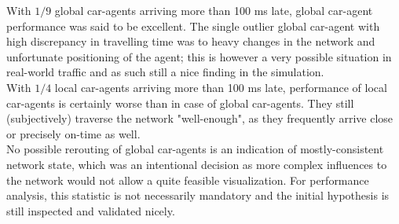 With $1/9$ global car-agents arriving more than 100 ms late, global car-agent performance was said to be excellent. The single outlier global car-agent with high discrepancy in travelling time was to heavy changes in the network and unfortunate positioning of the agent; this is however a very possible situation in real-world traffic and as such still a nice finding in the simulation. \\
With $1/4$ local car-agents arriving more than 100 ms late, performance of local car-agents is certainly worse than in case of global car-agents. They still (subjectively) traverse the network "well-enough", as they frequently arrive close or precisely on-time as well. \\
No possible rerouting of global car-agents is an indication of mostly-consistent network state, which was an intentional decision as more complex influences to the network would not allow a quite feasible visualization. For performance analysis, this statistic is not necessarily mandatory and the initial hypothesis is still inspected and validated nicely.
